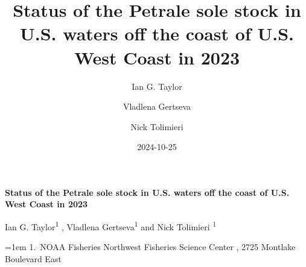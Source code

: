 \documentclass[
]{scrartcl}
\title{Status of the Petrale sole stock in U.S. waters off the coast of
U.S. West Coast in 2023}
\author{Ian G. Taylor \and Vladlena Gertseva \and Nick Tolimieri}
\date{2024-10-25}
\begin{document}
  \begin{titlepage}

  \begin{minipage}[b][\textheight][s]{\textwidth}
  \raggedright




  {\huge\bfseries\nohyphens{Status of the Petrale sole stock in U.S.
  waters off the coast of U.S. West Coast in 2023}}\\[1\baselineskip]


  \vspace{1\baselineskip}


  \vspace{1\baselineskip}

   {\large{Ian G. Taylor}}{\textsuperscript{1}}%
  ,
   {\large{Vladlena Gertseva}}{\textsuperscript{1}}%
  { and \large{Nick Tolimieri}}%
  {\textsuperscript{1}}%



  \vspace{2\baselineskip}

  \hangindent=1em
  {1}.~{NOAA Fisheries Northwest Fisheries Science Center}%
  , %
  {2725 Montlake Boulevard East}%


  \vspace{1\baselineskip}



  \vfill



\end{minipage}
\end{titlepage}
\end{document}
